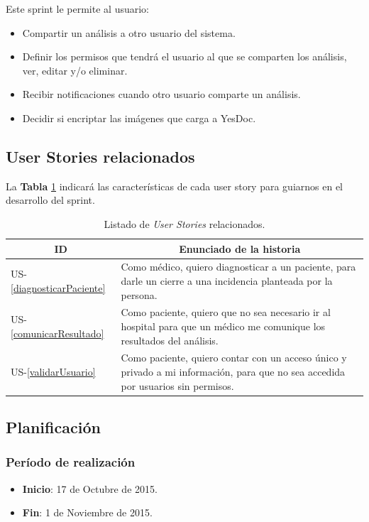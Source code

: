 Este sprint le permite al usuario:
	\begin{itemize}
		\item Compartir un análisis a otro usuario del sistema.
		\item Definir los permisos que tendrá el usuario al que se comparten los análisis, ver, editar y/o eliminar.
		\item Recibir notificaciones cuando otro usuario comparte un análisis.  
		\item Decidir si encriptar las imágenes que carga a YesDoc.
	\end{itemize}
	
\subsection{User Stories relacionados}
La \textbf{Tabla} \ref{US-Sprint8} indicará las características de cada user story para guiarnos en el desarrollo del sprint.

\newpage

\begin{table}[h]
	\centering
	\begin{tabular}{|l|p{9cm}|}
		\hline
		\multicolumn{1}{|c|}{\textbf{ID}} &
		\multicolumn{1}{|c|}{\textbf{Enunciado de la historia}} \\  
		\hline
		US-\ref{diagnosticarPaciente} &
		Como médico, quiero diagnosticar a un paciente, para darle un cierre a una incidencia planteada por la persona. \\ 
		\hline
		US-\ref{comunicarResultado} &
		Como paciente, quiero que no sea necesario ir al hospital para que un médico me comunique los resultados del análisis. \\       
		\hline
		US-\ref{validarUsuario} &
		Como paciente, quiero contar con un acceso único y privado a mi información, para que no sea accedida por usuarios sin permisos. \\
		\hline
	\end{tabular}
	\caption{Listado de \textit{User Stories} relacionados.}
	\label{US-Sprint8}
\end{table}

\subsection{Planificación}
\subsubsection{Período de realización}
\begin{itemize}
	\item \textbf{Inicio}: 17 de Octubre de 2015.
	\item \textbf{Fin}: 1 de Noviembre de 2015.
\end{itemize}

